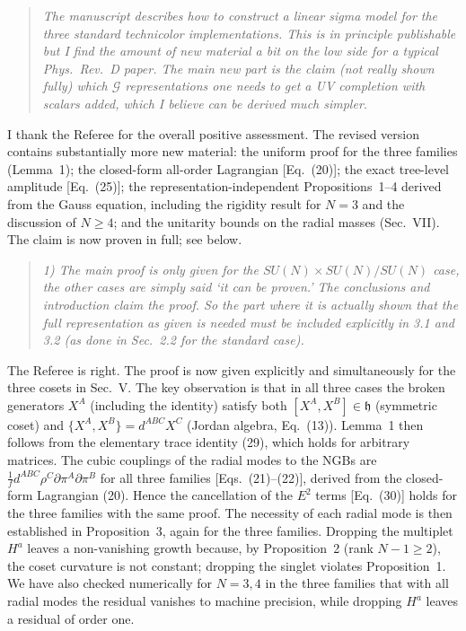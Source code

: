 \documentclass[11pt,a4paper]{article}
\newcommand{\referee}[1]{\begin{quote}\itshape\color{black!70}#1\end{quote}}
\begin{document}
\referee{The manuscript describes how to construct a linear sigma model for the three standard technicolor implementations. This is in principle publishable but I find the amount of new material a bit on the low side for a typical Phys.\ Rev.\ D paper. The main new part is the claim (not really shown fully) which $\mathcal{G}$ representations one needs to get a UV completion with scalars added, which I believe can be derived much simpler.}

I thank the Referee for the overall positive assessment. The revised version contains substantially more new material: the uniform proof for the three families (Lemma~1); the closed-form all-order Lagrangian [Eq.~(20)]; the exact tree-level amplitude [Eq.~(25)]; the representation-independent Propositions~1--4 derived from the Gauss equation, including the rigidity result for $N=3$ and the discussion of $N\ge4$; and the unitarity bounds on the radial masses (Sec.~VII). The claim is now proven in full; see below.

\referee{1) The main proof is only given for the $SU(N)\times SU(N)/SU(N)$ case, the other cases are simply said `it can be proven.' The conclusions and introduction claim the proof. So the part where it is actually shown that the full representation as given is needed must be included explicitly in 3.1 and 3.2 (as done in Sec.~2.2 for the standard case).}

The Referee is right. The proof is now given explicitly and simultaneously for the three cosets in Sec.~V. The key observation is that in all three cases the broken generators $X^A$ (including the identity) satisfy both $[X^A,X^B]\in\mathfrak{h}$ (symmetric coset) and $\{X^A,X^B\}=d^{ABC}X^C$ (Jordan algebra, Eq.~(13)). Lemma~1 then follows from the elementary trace identity (29), which holds for arbitrary matrices. The cubic couplings of the radial modes to the NGBs are $\frac1f d^{ABC}\rho^C\partial\pi^A\partial\pi^B$ for all three families [Eqs.~(21)--(22)], derived from the closed-form Lagrangian (20). Hence the cancellation of the $E^2$ terms [Eq.~(30)] holds for the three families with the same proof. The necessity of each radial mode is then established in Proposition~3, again for the three families. Dropping the multiplet $H^a$ leaves a non-vanishing growth because, by Proposition~2 (rank $N-1\ge2$), the coset curvature is not constant; dropping the singlet violates Proposition~1. We have also checked numerically for $N=3,4$ in the three families that with all radial modes the residual vanishes to machine precision, while dropping $H^a$ leaves a residual of order one.
\end{document}

